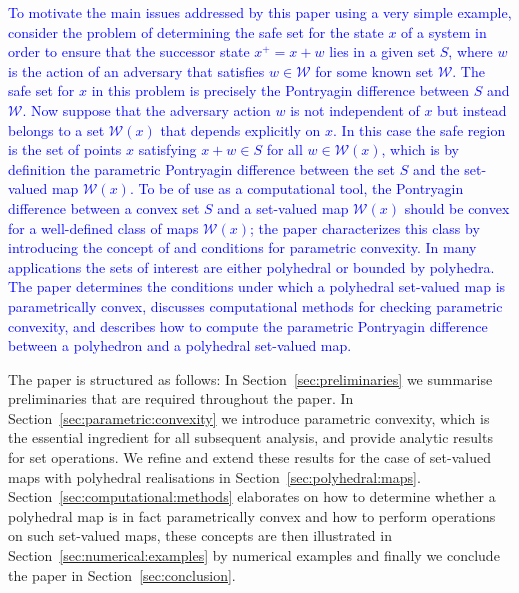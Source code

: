 \documentclass[smallextended]{svjour3}       %
\numberwithin{equation}{section}
\newcommand{\revision}[1]{\textcolor{blue}{#1}}
\begin{document}
\revision{To motivate the main issues addressed by this paper using a very simple example, consider the problem of determining the safe set for the state $x$ of a system in order to ensure that the successor state $x^+ = x + w$ lies in a given set $S$, where $w$ is the action of an adversary that satisfies $w\in\mathcal W$ for some known set $\mathcal W$. The safe set for $x$ in this problem is precisely the Pontryagin difference between $S$ and $\mathcal W$.
%
Now suppose that the adversary action $w$ is not independent of $x$ but instead belongs to a set $\mathcal W(x)$ that depends explicitly on $x$. In this case the safe region is the set of points $x$ satisfying $x+w\in S$ for all $w\in \mathcal W(x)$, which is by definition the parametric Pontryagin difference between the set $S$ and the set-valued map $\mathcal W(x)$. 
%
To be of use as a computational tool, the Pontryagin difference between a convex set $S$ and a set-valued map $\mathcal W(x)$ should be convex for a well-defined class of maps $\mathcal W(x)$; the paper characterizes this class by introducing the concept of and conditions for parametric convexity. 
%
In many applications the sets of interest are either polyhedral or bounded by polyhedra. The paper determines the conditions under which a polyhedral set-valued map is parametrically convex, discusses computational methods for checking parametric convexity, and describes how to compute the parametric Pontryagin difference between a polyhedron and a polyhedral set-valued map.
}



The paper is structured as follows:
%
In Section~\ref{sec:preliminaries} we summarise preliminaries that are
required throughout the paper. In
Section~\ref{sec:parametric:convexity} we introduce parametric
convexity, which is the essential ingredient for all subsequent
analysis, and provide analytic results for set operations. 
We refine and extend these results for the case of set-valued maps with polyhedral realisations in Section~\ref{sec:polyhedral:maps}.
%
Section~\ref{sec:computational:methods} elaborates on how to determine whether a polyhedral map is in fact parametrically convex and how to perform operations on such set-valued maps, these concepts are then illustrated in Section~\ref{sec:numerical:examples} by numerical examples and finally we conclude the paper in Section~\ref{sec:conclusion}.
\end{document}
